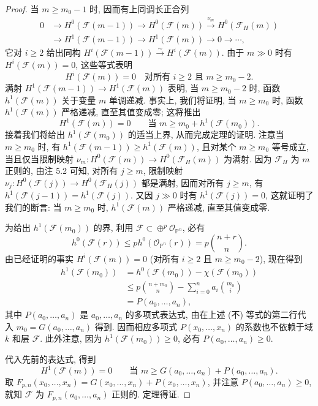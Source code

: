 \begin{proof}
当 $m\geq m_0-1$ 时, 因而有上同调长正合列
\[
\begin{aligned}
0&\longrightarrow H^0(\mathcal F(m-1))\longrightarrow H^0(\mathcal F(m))
 \xrightarrow{\nu_m}H^0(\mathcal F_H(m))\\
 &\longrightarrow H^1(\mathcal F(m-1))\longrightarrow H^1(\mathcal F(m))
 \longrightarrow0\longrightarrow\cdots,
\end{aligned}
\]
它对 $i\geq2$ 给出同构 $H^i(\mathcal F(m-1))\xrightarrow{\sim}H^i(\mathcal F(m))$. 由于 $m\gg0$ 时有 $H^i(\mathcal F(m))=0$, 这些等式表明
\[
 H^i(\mathcal F(m))=0\quad\text{对所有 }i\geq2\text{ 且 }m\geq m_0-2.
\]
满射 $H^1(\mathcal F(m-1))\to H^1(\mathcal F(m))$ 表明, 当 $m\geq m_0-2$ 时, 函数 $h^1(\mathcal F(m))$ 关于变量 $m$ 单调递减. 事实上, 我们将证明, 当 $m\geq m_0$ 时, 函数 $h^1(\mathcal F(m))$ 严格递减, 直至其值变成零; 这将推出
\[
 H^1(\mathcal F(m))=0\qquad\text{当 }m\geq m_0+h^1(\mathcal F(m_0)).
\]
接着我们将给出 $h^1(\mathcal F(m_0))$ 的适当上界, 从而完成定理的证明. 注意当 $m\geq m_0$ 时, 有 $h^1(\mathcal F(m-1))\geq h^1(\mathcal F(m))$, 且对某个 $m\geq m_0$ 等号成立, 当且仅当限制映射 $\nu_m:H^0(\mathcal F(m))\to H^0(\mathcal F_H(m))$ 为满射. 因为 $\mathcal F_H$ 为 $m$ 正则的, 由注 5.2 可知, 对所有 $j\geq m$, 限制映射 $\nu_j:H^0(\mathcal F(j))\to H^0(\mathcal F_H(j))$ 都是满射, 因而对所有 $j\geq m$, 有 $h^1(\mathcal F(j-1))=h^1(\mathcal F(j))$. 又因 $j\gg0$ 时有 $h^1(\mathcal F(j))=0$, 这就证明了我们的断言: 当 $m\geq m_0$ 时, $h^1(\mathcal F(m))$ 严格递减, 直至其值变成零.

为给出 $h^1(\mathcal F(m_0))$ 的界, 利用 $\mathcal F\subset\oplus^p\mathcal O_{\mathbb P^n}$, 必有
\[
 h^0(\mathcal F(r))\leq p h^0(\mathcal O_{\mathbb P^n}(r))=p\binom{n+r}{n}.
\]
由已经证明的事实 $H^i(\mathcal F(m))=0$ (对所有 $i\geq2$ 且 $m\geq m_0-2$), 现在得到
\[
\begin{aligned}
 h^1(\mathcal F(m_0))
 &=h^0(\mathcal F(m_0))-\chi(\mathcal F(m_0))\\
 &\leq p\binom{n+m_0}{n}-\sum_{i=0}^n a_i\binom{m_0}{i}\\
 &=P(a_0,\ldots,a_n),
\end{aligned}
\]
其中 $P(a_0,\ldots,a_n)$ 是 $a_0,\ldots,a_n$ 的多项式表达式, 由在上述 (不) 等式的第二行代入 $m_0=G(a_0,\ldots,a_n)$ 得到. 因而相应多项式 $P(x_0,\ldots,x_n)$ 的系数也不依赖于域 $k$ 和层 $\mathcal F$. 此外注意, 因为 $h^1(\mathcal F(m_0))\geq0$, 必有 $P(a_0,\ldots,a_n)\geq0$.

代入先前的表达式, 得到
\[
 H^1(\mathcal F(m))=0\qquad\text{当 }m\geq G(a_0,\ldots,a_n)+P(a_0,\ldots,a_n).
\]
取 $F_{p,n}(x_0,\ldots,x_n)=G(x_0,\ldots,x_n)+P(x_0,\ldots,x_n)$, 并注意 $P(a_0,\ldots,a_n)\geq0$, 就知 $\mathcal F$ 为 $F_{p,n}(a_0,\ldots,a_n)$ 正则的. 定理得证.
\end{proof}

